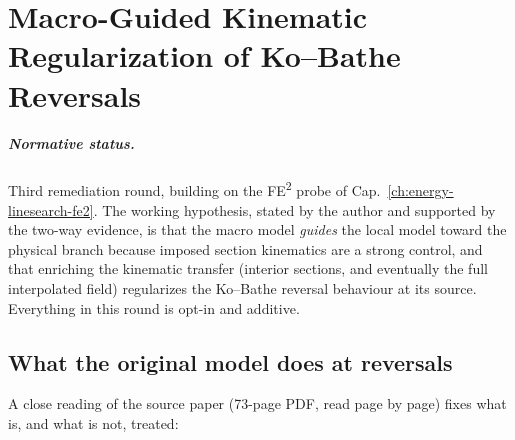 
\chapter{Macro-Guided Kinematic Regularization of Ko--Bathe Reversals}
\label{ch:kinematic-regularization}

\paragraph{Normative status.}
Third remediation round, building on the FE\textsuperscript{2} probe of
Cap.~\ref{ch:energy-linesearch-fe2}. The working hypothesis, stated by
the author and supported by the two-way evidence, is that the macro
model \emph{guides} the local model toward the physical branch because
imposed section kinematics are a strong control, and that enriching the
kinematic transfer (interior sections, and eventually the full
interpolated field) regularizes the Ko--Bathe reversal behaviour at its
source. Everything in this round is opt-in and additive.

\section{What the original model does at reversals}
\label{sec:kb-paper-reversals}

A close reading of the source paper \cite{KoBathe2026} (73-page PDF,
read page by page) fixes what is, and what is not, treated:

